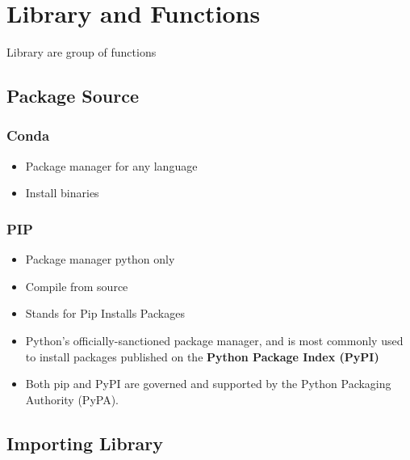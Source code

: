 \documentclass[
]{book}
\providecommand{\tightlist}{%
  \setlength{\itemsep}{0pt}\setlength{\parskip}{0pt}}
\begin{document}
\hypertarget{library-and-functions}{%
\chapter{Library and Functions}\label{library-and-functions}}

Library are group of functions

\hypertarget{package-source}{%
\section{Package Source}\label{package-source}}

\hypertarget{conda-1}{%
\subsection{Conda}\label{conda-1}}

\begin{itemize}
\tightlist
\item
  Package manager for any language\\
\item
  Install binaries
\end{itemize}

\hypertarget{pip-1}{%
\subsection{PIP}\label{pip-1}}

\begin{itemize}
\tightlist
\item
  Package manager python only\\
\item
  Compile from source\\
\item
  Stands for Pip Installs Packages\\
\item
  Python's officially-sanctioned package manager, and is most commonly used to install packages published on the \textbf{Python Package Index (PyPI)}\\
\item
  Both pip and PyPI are governed and supported by the Python Packaging Authority (PyPA).
\end{itemize}

\hypertarget{importing-library}{%
\section{Importing Library}\label{importing-library}}
\end{document}
